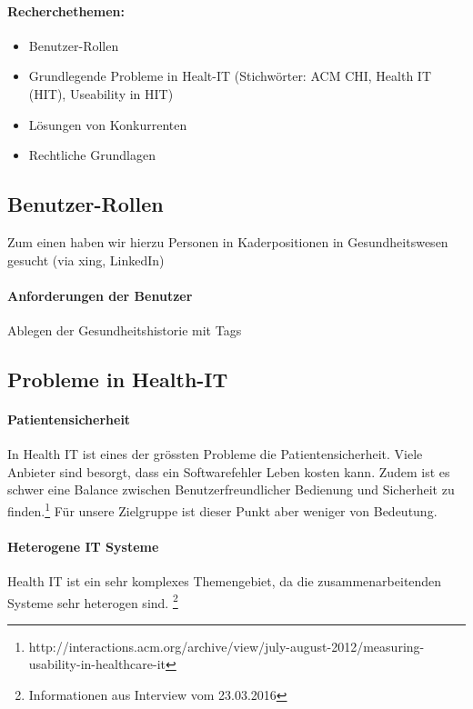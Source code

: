 \documentclass[a4paper]{scrreprt}
\begin{document}
\paragraph{Recherchethemen:} 
\begin{itemize}
\item Benutzer-Rollen
\item Grundlegende Probleme in Healt-IT (Stichwörter: ACM CHI, Health IT (HIT), Useability in HIT)
\item Lösungen von Konkurrenten
\item Rechtliche Grundlagen
\end{itemize}

\subsection{Benutzer-Rollen}
Zum einen haben wir hierzu Personen in Kaderpositionen in Gesundheitswesen gesucht (via xing, LinkedIn) 




\paragraph{Anforderungen der Benutzer}
Ablegen der Gesundheitshistorie mit Tags


\subsection{Probleme in Health-IT}
\paragraph{Patientensicherheit} In Health IT ist eines der grössten Probleme die Patientensicherheit. Viele Anbieter sind besorgt, dass ein Softwarefehler Leben kosten kann. Zudem ist es schwer eine Balance zwischen Benutzerfreundlicher Bedienung und Sicherheit zu finden.\footnote{http://interactions.acm.org/archive/view/july-august-2012/measuring-usability-in-healthcare-it}
Für unsere Zielgruppe ist dieser Punkt aber weniger von Bedeutung.

\paragraph{Heterogene IT Systeme} Health IT ist ein sehr komplexes Themengebiet, da die zusammenarbeitenden Systeme sehr heterogen sind. \footnote{Informationen aus Interview vom 23.03.2016}
\end{document}
